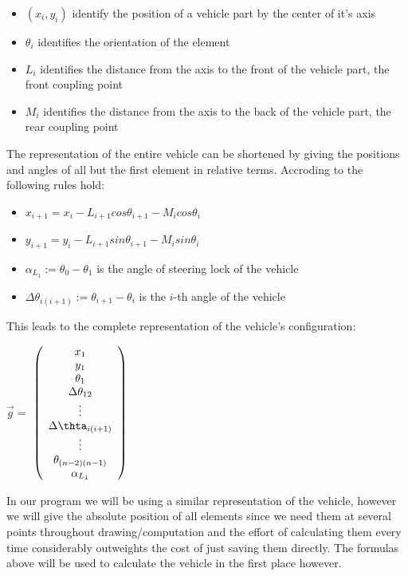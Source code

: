 \begin{itemize}
	\item $(x_i,y_i)$ identify the position of a vehicle part by the center of it's axis
	\item $\theta_i$ identifies the orientation of the element
	\item $L_i$ identifies the distance from the axis to the front of the vehicle part, the front coupling point
	\item $M_i$ identifies the distance from the axis to the back of the vehicle part, the rear coupling point
\end{itemize}

The representation of the entire vehicle can be shortened by giving the positions and angles of all but the first element in relative terms. Accroding to \cite{28} the following rules hold:
\begin{itemize}
	\item $x_{i+1}=x_i-L_{i+1} cos \theta_{i+1}-M_i cos \theta_i$
	\item $y_{i+1}=y_i-L_{i+1} sin \theta_{i+1}-M_i sin \theta_i$
	\item $\alpha_{L_1}:=\theta_0-\theta_1$ is the angle of steering lock of the vehicle
	\item $\Delta \theta_{i(i+1)}:= \theta_{i+1}-\theta_i$ is the $i$-th angle of the vehicle
\end{itemize}

This leads to the complete representation of the vehicle's configuration:
\begin{center}
$\vec{g}=$
$\left(
	\begin{array}{c}
		x_1\\
		y_1\\
		\theta_1\\
		\Delta \theta_{12}\\
		\vdots\\
		\Delta \thta_{i(i+1)}\\
		\vdots\\
		\theta_{(n-2)(n-1)}\\
		\alpha_{L_1} 
	\end{array}
\right)$
\end{center}

In our program we will be using a similar representation of the vehicle, however we will give the absolute position of all elements since we need them at several points throughout drawing/computation and the effort of calculating them every time considerably outweights the cost of just saving them directly. The formulas above will be used to calculate the vehicle in the first place however.

